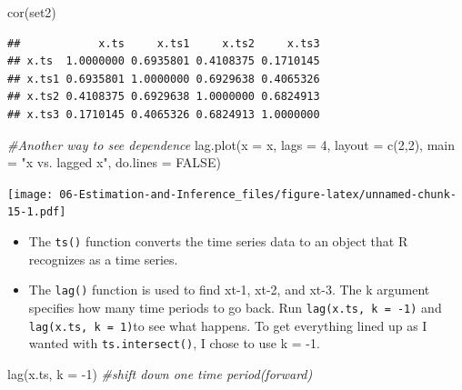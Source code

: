 \documentclass[
]{book}
\newenvironment{Shaded}{\begin{snugshade}}{\end{snugshade}}
\newcommand{\AttributeTok}[1]{\textcolor[rgb]{0.77,0.63,0.00}{#1}}
\newcommand{\CommentTok}[1]{\textcolor[rgb]{0.56,0.35,0.01}{\textit{#1}}}
\newcommand{\ConstantTok}[1]{\textcolor[rgb]{0.00,0.00,0.00}{#1}}
\newcommand{\DecValTok}[1]{\textcolor[rgb]{0.00,0.00,0.81}{#1}}
\newcommand{\FunctionTok}[1]{\textcolor[rgb]{0.00,0.00,0.00}{#1}}
\newcommand{\NormalTok}[1]{#1}
\newcommand{\SpecialCharTok}[1]{\textcolor[rgb]{0.00,0.00,0.00}{#1}}
\newcommand{\StringTok}[1]{\textcolor[rgb]{0.31,0.60,0.02}{#1}}
\providecommand{\tightlist}{%
  \setlength{\itemsep}{0pt}\setlength{\parskip}{0pt}}
\theoremstyle{definition}
\theoremstyle{definition}
\theoremstyle{definition}
\theoremstyle{definition}
\theoremstyle{remark}
\begin{document}
\begin{Shaded}
\begin{Highlighting}[]
\FunctionTok{cor}\NormalTok{(set2)}
\end{Highlighting}
\end{Shaded}

\begin{verbatim}
##            x.ts     x.ts1     x.ts2     x.ts3
## x.ts  1.0000000 0.6935801 0.4108375 0.1710145
## x.ts1 0.6935801 1.0000000 0.6929638 0.4065326
## x.ts2 0.4108375 0.6929638 1.0000000 0.6824913
## x.ts3 0.1710145 0.4065326 0.6824913 1.0000000
\end{verbatim}

\begin{Shaded}
\begin{Highlighting}[]
\CommentTok{\#Another way to see dependence}
\FunctionTok{lag.plot}\NormalTok{(}\AttributeTok{x =}\NormalTok{ x, }\AttributeTok{lags =} \DecValTok{4}\NormalTok{, }\AttributeTok{layout =} \FunctionTok{c}\NormalTok{(}\DecValTok{2}\NormalTok{,}\DecValTok{2}\NormalTok{), }\AttributeTok{main =} \StringTok{"x vs. lagged x"}\NormalTok{,}
    \AttributeTok{do.lines =} \ConstantTok{FALSE}\NormalTok{)}
\end{Highlighting}
\end{Shaded}

\texttt{[image: 06-Estimation-and-Inference\_files/figure-latex/unnamed-chunk-15-1.pdf]}

\begin{itemize}
\tightlist
\item
  The \texttt{ts()} function converts the time series data to an object that R recognizes as a time series.\\
\item
  The \texttt{lag()} function is used to find xt-1, xt-2, and xt-3. The k argument specifies how many time periods to go back. Run \texttt{lag(x.ts,\ k\ =\ -1)} and \texttt{lag(x.ts,\ k\ =\ 1)}to see what happens. To get everything lined up as I wanted with \texttt{ts.intersect()}, I chose to use k = -1.
\end{itemize}

\begin{Shaded}
\begin{Highlighting}[]
\FunctionTok{lag}\NormalTok{(x.ts, }\AttributeTok{k =} \SpecialCharTok{{-}}\DecValTok{1}\NormalTok{) }\CommentTok{\#shift down one time period(forward)}
\end{Highlighting}
\end{Shaded}
\end{document}
